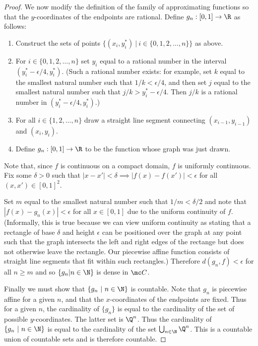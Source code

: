 \begin{enumerate}[label=(2.\arabic*)]
\begin{proof}
    We now modify the definition of the family of approximating functions so that the $y$-coordinates of the
    endpoints are rational. Define $g_n: [0, 1] \to \R$ as follows:
    \begin{enumerate}
    \item Construct the sets of points $\{(x_i, y^*_i) ~|~ i \in \{0, 1, 2, \ldots, n\}\}$ as above.
    \item For $i \in \{0, 1, 2, \ldots, n\}$ set $y_i$ equal to a rational number in the
      interval $(y^*_i - \epsilon/4, y^*_i)$. (Such a rational number exists: for example, set $k$ equal to the
      smallest natural number such that $1/k < \epsilon/4$, and then set $j$ equal to the smallest natural number
      such that $j/k > y^*_i - \epsilon/4$. Then $j/k$ is a rational number in $(y^*_i - \epsilon/4, y^*_i)$.)
    \item For all $i \in \{1, 2, \ldots, n\}$ draw a straight line segment connecting $(x_{i-1}, y_{i-1})$
      and $(x_i, y_i)$.
    \item Define $g_n: [0, 1] \to \R$ to be the function whose graph was just drawn.
    \end{enumerate}
    Note that, since $f$ is continuous on a compact domain, $f$ is uniformly continuous. Fix some $\delta > 0$ such
    that $|x - x'| < \delta \implies |f(x) - f(x')| < \epsilon$ for all $(x, x') \in [0, 1]^2$.

    Set $m$ equal to the smallest natural number such that $1/m < \delta/2$ and note
    that $|f(x) - g_n(x)| < \epsilon$ for all $x \in [0, 1]$ due to the uniform continuity of $f$. (Informally,
    this is true because we can view uniform continuity as stating that a rectangle of base $\delta$ and
    height $\epsilon$ can be positioned over the graph at any point such that the graph intersects the left and
    right edges of the rectange but does not otherwise leave the rectangle. Our piecewise affine function
    consists of straight line segments that fit within such rectangles.) Therefore $d(g_n, f) < \epsilon$ for
    all $n \geq m$ and so $\{g_n | n \in \N\}$ is dense in $\mc C$.

    Finally we must show that $\{g_n ~|~ n \in \N\}$ is countable. Note that $g_n$ is piecewise affine for a
    given $n$, and that the $x$-coordinates of the endpoints are fixed. Thus for a given $n$, the cardinality
    of $\{g_n\}$ is equal to the cardinality of the set of possible $y$-coordinates. The latter set is $\Q^n$.
    Thus the cardinality of $\{g_n ~|~ n \in \N\}$ is equal to the cardinality of the
    set $\bigcup_{n\in \N} \Q^n$. This is a countable union of countable sets and is therefore countable.
  \end{proof}


\end{enumerate}
